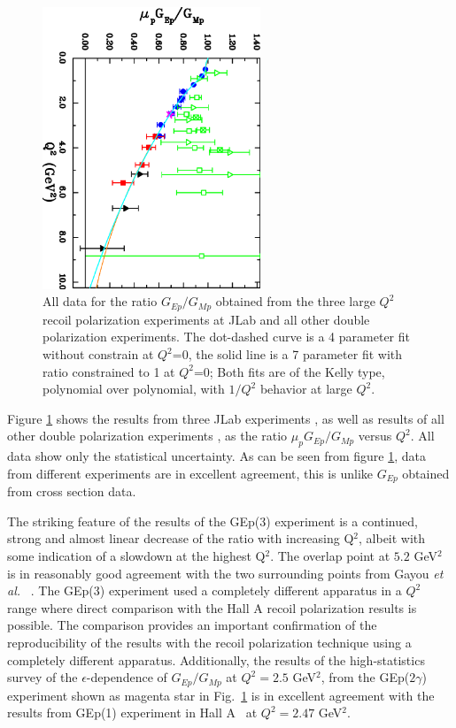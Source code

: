 \begin{figure}
\begin{center}
\includegraphics[width=65mm,angle=90]{gepgmp_allpol_allcs_noth_11072014.eps}
\caption{All data for the ratio $G_{Ep}/G_{Mp}$ obtained from the three large $Q^2$ recoil polarization experiments at 
JLab and all other double polarization experiments. The dot-dashed curve is a 4 parameter fit without constrain at $Q^2$=0, the solid line is a 7 parameter 
fit with ratio constrained to 1 at $Q^2$=0; Both fits are of the Kelly type, polynomial over polynomial, with $1/Q^2$ behavior at large $Q^2$.}
\label{fig:gepgmp_all_pol}
\end{center}
\end{figure}

Figure \ref{fig:gepgmp_all_pol} shows the results from three JLab experiments \cite{jones,gayou:2002,punjabi05A,puckett:2010}, as well as results of 
all other double polarization  experiments \cite{milbrathA,gayou:2001,pospischil,dietrich,strauch,hu,mac,Jones06,crawford,paolone:2010}, as the 
ratio $\mu_{p}G_{Ep}/G_{Mp}$ versus $Q^2$. All data show only the statistical uncertainty. As can be seen from figure \ref{fig:gepgmp_all_pol}, data from 
different experiments are in excellent agreement, this is unlike $G_{Ep}$ obtained from cross section data. 

The striking feature of the results of the GEp(3) experiment is a continued, strong and almost linear
decrease of the ratio with increasing Q$^2$, albeit with some indication of a slowdown at the highest Q$^2$. 
The overlap point at $5.2$ GeV$^2$ is in reasonably good agreement with the two 
surrounding points from Gayou {\it et al.} ~\cite{gayou:2001}. The GEp(3) experiment used a completely different 
apparatus in a $Q^2$ range where direct comparison with the Hall A recoil polarization 
results is possible. The comparison provides an important confirmation of the reproducibility 
of the results with the recoil polarization technique using a completely different apparatus.
Additionally, the results of the high-statistics survey of the $\epsilon$-dependence 
of $G_{Ep}/G_{Mp}$ at $Q^2=2.5$ GeV$^2$, from the GEp($2 \gamma$) experiment \cite{Meziane:2010}
shown as magenta star in  
Fig.~\ref{fig:gepgmp_all_pol} is in excellent agreement with the results from GEp(1) experiment in Hall A~\cite{punjabi05A} 
at $Q^2=2.47$ GeV$^2$.

